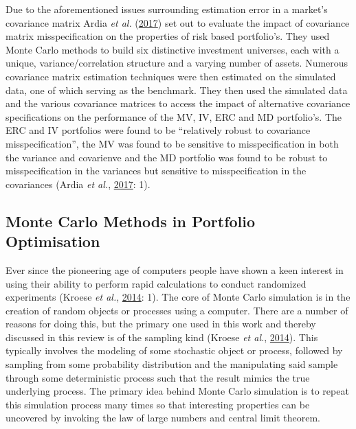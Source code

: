 \documentclass[11pt,preprint, authoryear]{elsarticle}
\numberwithin{equation}{section}
\numberwithin{figure}{section}
\numberwithin{table}{section}
\begin{document}
Due to the aforementioned issues surrounding estimation error in a
market's covariance matrix Ardia \emph{et al.}
(\protect\hyperlink{ref-ardia2017}{2017}) set out to evaluate the impact
of covariance matrix misspecification on the properties of risk based
portfolio's. They used Monte Carlo methods to build six distinctive
investment universes, each with a unique, variance/correlation structure
and a varying number of assets. Numerous covariance matrix estimation
techniques were then estimated on the simulated data, one of which
serving as the benchmark. They then used the simulated data and the
various covariance matrices to access the impact of alternative
covariance specifications on the performance of the MV, IV, ERC and MD
portfolio's. The ERC and IV portfolios were found to be ``relatively
robust to covariance misspecification'', the MV was found to be
sensitive to misspecification in both the variance and covarienve and
the MD portfolio was found to be robust to misspecification in the
variances but sensitive to misspecification in the covariances (Ardia
\emph{et al.}, \protect\hyperlink{ref-ardia2017}{2017}: 1).

\hypertarget{monte-carlo-methods-in-portfolio-optimisation}{%
\subsection{Monte Carlo Methods in Portfolio
Optimisation}\label{monte-carlo-methods-in-portfolio-optimisation}}

Ever since the pioneering age of computers people have shown a keen
interest in using their ability to perform rapid calculations to conduct
randomized experiments (Kroese \emph{et al.},
\protect\hyperlink{ref-kroese2014}{2014}: 1). The core of Monte Carlo
simulation is in the creation of random objects or processes using a
computer. There are a number of reasons for doing this, but the primary
one used in this work and thereby discussed in this review is of the
sampling kind (Kroese \emph{et al.},
\protect\hyperlink{ref-kroese2014}{2014}). This typically involves the
modeling of some stochastic object or process, followed by sampling from
some probability distribution and the manipulating said sample through
some deterministic process such that the result mimics the true
underlying process. The primary idea behind Monte Carlo simulation is to
repeat this simulation process many times so that interesting properties
can be uncovered by invoking the law of large numbers and central limit
theorem.
\end{document}
